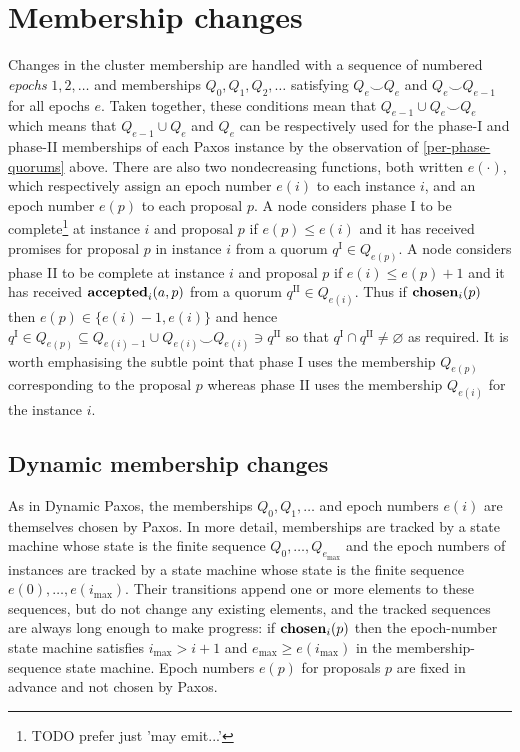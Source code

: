 \documentclass[journal]{IEEEtran}
\begin{document}
\section{Membership changes}\label{membership-changes}

Changes in the cluster membership are handled with a sequence of numbered
\textit{epochs} $1, 2, \ldots$ and memberships $Q_0, Q_1, Q_2, \ldots$
satisfying $Q_e \smile Q_e$ and $Q_e \smile Q_{e-1}$ for all epochs $e$.  Taken
together, these conditions mean that $Q_{e-1} \cup Q_e \smile Q_e$ which means
that $Q_{e-1} \cup Q_e$ and $Q_e$ can be respectively used for the phase-I and
phase-II memberships of each Paxos instance by the observation of
\ref{per-phase-quorums} above.  There are also two nondecreasing functions,
both written $e(\cdot)$, which respectively assign an epoch number $e(i)$ to
each instance $i$, and an epoch number $e(p)$ to each proposal $p$. A node
considers phase I to be complete\footnote{TODO prefer just 'may emit...'} at
instance $i$ and proposal $p$ if $e(p) \le e(i)$ and it has received promises
for proposal $p$ in instance $i$ from a quorum $q^\textrm{I} \in Q_{e(p)}$. A
node considers phase II to be complete at instance $i$ and proposal $p$ if
$e(i) \le e(p)+1$ and it has received $\mathbf{accepted}_{i}(a,p)$ from a quorum
$q^\textrm{II} \in Q_{e(i)}$.  Thus if $\mathbf{chosen}_{i}(p)$ then $e(p) \in \{
e(i)-1, e(i) \}$ and hence $q^\textrm{I} \in Q_{e(p)} \subseteq Q_{e(i)-1} \cup
Q_{e(i)} \smile Q_{e(i)} \ni q^\textrm{II}$ so that $q^\textrm{I} \cap
q^\textrm{II} \ne \varnothing$ as required. It is worth emphasising the subtle
point that phase I uses the membership $Q_{e(p)}$ corresponding to the proposal
$p$ whereas phase II uses the membership $Q_{e(i)}$ for the instance $i$.

\subsection{Dynamic membership changes}

As in Dynamic Paxos, the memberships $Q_0, Q_1, \ldots$ and epoch numbers
$e(i)$ are themselves chosen by Paxos. In more detail, memberships are tracked
by a state machine whose state is the finite sequence $Q_0, \ldots,
Q_{e_\mathrm{max}}$ and the epoch numbers of instances are tracked by a state
machine whose state is the finite sequence $e(0), \ldots, e(i_\mathrm{max})$.
Their transitions append one or more elements to these sequences, but do not
change any existing elements, and the tracked sequences are always long enough
to make progress: if $\mathbf{chosen}_{i}(p)$ then the epoch-number state machine
satisfies $i_\mathrm{max} > i+1$ and $e_\mathrm{max} \ge e(i_\mathrm{max})$ in
the membership-sequence state machine. Epoch numbers $e(p)$ for proposals $p$
are fixed in advance and not chosen by Paxos.
\end{document}
